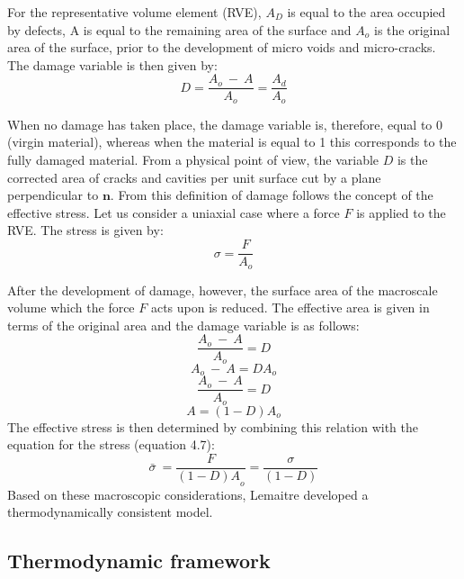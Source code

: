 \documentclass[sn-mathphys,Numbered,draft]{sn-jnl}%
\begin{document}
For the representative volume element (RVE), $A_D$ is equal to the area occupied by defects, A is equal to the remaining area of the surface and $A_o$ is the original area of the surface, prior to the development of micro voids and micro-cracks. The damage variable is then given by:
\begin{equation}
	D=\frac{A_o\ -\ A}{A_o}=\frac{A_d}{A_o}	
\end{equation}


 When no damage has taken place, the damage variable is, therefore, equal to 0 (virgin material), whereas when the material is equal to 1 this corresponds to the fully damaged material. From a physical point of view, the variable $D$ is the corrected area of cracks and cavities per unit surface cut by a plane perpendicular to $\mathbf{n}$. 
From this definition of damage follows the concept of the effective stress. Let us consider a uniaxial case where a force $F$ is applied to the RVE. The stress is given by:
\begin{equation}
	\sigma=\frac{F}{A_o}	
\end{equation}

After the development of damage, however, the surface area of the macroscale volume which the force $F$ acts upon is reduced. The effective area is given in terms of the original area and the damage variable is as follows:
\begin{equation}
	\frac{A_o\ -\ A}{A_o}=D	
\end{equation}
\begin{equation}
	A_o\ -\ A=DA_o	
\end{equation}
\begin{equation}
	\frac{A_o\ -\ A}{A_o}=D	
\end{equation}
\begin{equation}
	A=\left(1-D\right)A_o	
\end{equation}
 The effective stress is then determined by combining this relation with the equation for the stress (equation 4.7):
 \begin{equation}
	\bar{\sigma}\ =\frac{F}{{\left(1-D\right)A}_o}=\frac{\sigma}{\left(1-D\right)}	
\end{equation}
Based on these macroscopic considerations, Lemaitre \cite{lemaitre_continuous_1985} developed a thermodynamically consistent model.

\subsection{Thermodynamic framework}
\end{document}

